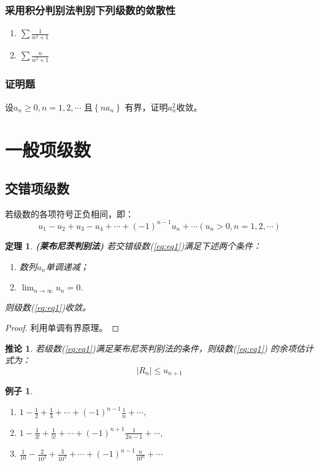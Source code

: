 \documentclass[a4paper,12pt]{article}
\newtheorem{theorem}{定理}
\newtheorem{example}{例子}
\newtheorem{corollary}{推论}
\let\oldref\ref
\renewcommand{\ref}[1]{\rm{(\oldref{#1})}}
\begin{document}
\subsubsection{采用积分判别法判别下列级数的敛散性}
\begin{enumerate}[label={\rm(\arabic*)}]
    \item $\displaystyle \sum \frac{1}{n^2 + 1}$
    \item $\displaystyle \sum \frac{n}{n^2 + 1}$
\end{enumerate}

\subsubsection{证明题}
设$\displaystyle a_n \ge 0, n = 1,2, \cdots$ 且$\displaystyle \left\{na_n\right\}$
有界，证明$\displaystyle a_n^2$收敛。 

\section{一般项级数}
\subsection{交错项级数}
若级数的各项符号正负相间，即：
\begin{equation}
    u_1 - u_2 + u_3 - u_4 + \cdots + (-1)^{n-1}u_n + \cdots \left(u_n > 0, n = 1, 2, \cdots\right)
    \label{eq:eq1}
\end{equation}
\begin{theorem}{\rm\textbf{(莱布尼茨判别法)}}
    若交错级数\ref{eq:eq1}满足下述两个条件：
    \begin{enumerate}[label={\rm(\arabic*)}]
        \item 数列$\displaystyle u_n$单调递减；
        \item $\displaystyle \lim_{n \to \infty} u_n = 0.$
    \end{enumerate}
    则级数\ref{eq:eq1}收敛。
\end{theorem}
\begin{proof}
    利用单调有界原理。
\end{proof}

\begin{corollary}
    若级数\ref{eq:eq1}满足莱布尼茨判别法的条件，则级数\ref{eq:eq1}
    的余项估计式为：
    \[
        \left|R_n\right| \le u_{n+1}
        \]
\end{corollary}

\begin{example}
    \begin{enumerate}[label={\rm(\arabic*)}]
        
        \item $\displaystyle 1 - \frac{1}{2} + \frac{1}{3} + \cdots + 
            (-1)^{n-1}\frac{1}{n} + \cdots,$
        \item $\displaystyle 1 - \frac{1}{3!} + \frac{1}{5!} + \cdots + 
            (-1)^{n+1}\frac{1}{2n-1} + \cdots,$
        \item $\displaystyle \frac{1}{10} - \frac{2}{10^2} + \frac{3}{10^3} + \cdots + 
            (-1)^{n-1}\frac{n}{10^n} + \cdots$
    \end{enumerate}
\end{example}
\end{document}
